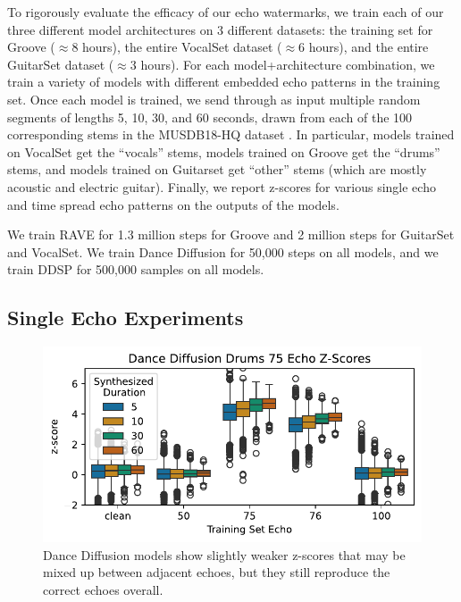 \documentclass[letterpaper]{article} %
\begin{document}
To rigorously evaluate the efficacy of our echo watermarks, we train each of our three different model architectures on 3 different datasets:  the training set for Groove \cite{groove2019} ($\approx$8 hours), the entire VocalSet dataset \cite{wilkins2018vocalset} ($\approx$6 hours), and the entire GuitarSet dataset \cite{xi2018guitarset} ($\approx$3 hours).  For each model+architecture combination, we train a variety of models with different embedded echo patterns in the training set.  Once each model is trained, we send through as input multiple random segments of lengths 5, 10, 30, and 60 seconds, drawn from each of the 100 corresponding stems in the MUSDB18-HQ dataset \cite{musdb18-hq}.  In particular, models trained on VocalSet get the ``vocals'' stems, models trained on Groove get the ``drums'' stems, and models trained on Guitarset get ``other'' stems (which are mostly acoustic and electric guitar).  Finally, we report z-scores for various single echo and time spread echo patterns on the outputs of the models.

We train RAVE for 1.3 million steps for Groove and 2 million steps for GuitarSet and VocalSet.  We train Dance Diffusion for 50,000 steps on all models, and we train DDSP for 500,000 samples on all models.  

\subsection{Single Echo Experiments}
\label{sec:experimentssingleecho}

\begin{figure}
    \centering
    \includegraphics[width=\columnwidth]{figs/DanceDiffusionZScoreExamples.pdf}
    \caption{Dance Diffusion models show slightly weaker z-scores that may be mixed up between adjacent echoes, but they still reproduce the correct echoes overall.}
    \label{fig:dancediffusionzscoreexamples}
\end{figure}
\end{document}
